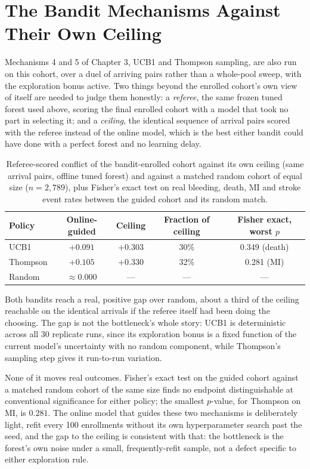 \section{The Bandit Mechanisms Against Their Own Ceiling}

Mechanisms 4 and 5 of Chapter 3, UCB1 and Thompson sampling, are also run on this cohort,
over a duel of arriving pairs rather than a whole-pool sweep, with the exploration bonus
active. Two things beyond the enrolled cohort's own view of itself are needed to judge
them honestly: a \emph{referee}, the same frozen tuned forest used above, scoring the
final enrolled cohort with a model that took no part in selecting it; and a
\emph{ceiling}, the identical sequence of arrival pairs scored with the referee instead of
the online model, which is the best either bandit could have done with a perfect forest
and no learning delay.

\begin{table}[h]
\centering
\caption{Referee-scored conflict of the bandit-enrolled cohort against its own ceiling
(same arrival pairs, offline tuned forest) and against a matched random cohort of equal
size ($n = 2{,}789$), plus Fisher's exact test on real bleeding, death, MI and stroke
event rates between the guided cohort and its random match.}
\label{tab:ch8-bandits}
\begin{tabular}{lccc|c}
\toprule
Policy & Online-guided & Ceiling & Fraction of ceiling & Fisher exact, worst $p$ \\
\midrule
UCB1     & $+0.091$ & $+0.303$ & 30\% & 0.349 (death) \\
Thompson & $+0.105$ & $+0.330$ & 32\% & 0.281 (MI) \\
Random   & $\approx 0.000$ & --- & --- & --- \\
\bottomrule
\end{tabular}
\end{table}

Both bandits reach a real, positive gap over random, about a third of the ceiling
reachable on the identical arrivals if the referee itself had been doing the choosing.
The gap is not the bottleneck's whole story: UCB1 is deterministic across all 30 replicate
runs, since its exploration bonus is a fixed function of the current model's uncertainty
with no random component, while Thompson's sampling step gives it run-to-run variation.

\vspace{10pt}

None of it moves real outcomes. Fisher's exact test on the guided cohort against a
matched random cohort of the same size finds no endpoint distinguishable at conventional
significance for either policy; the smallest $p$-value, for Thompson on MI, is $0.281$.
The online model that guides these two mechanisms is deliberately light, refit every 100
enrollments without its own hyperparameter search past the seed, and the gap to the
ceiling is consistent with that: the bottleneck is the forest's own noise under a small,
frequently-refit sample, not a defect specific to either exploration rule.

